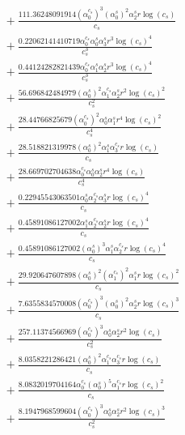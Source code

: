 \documentclass[10pt]{article}
\begin{document}
\begin{align*}
&{}  + \frac{111.36248091914 \left(\alpha_{0}^{c_s}\right)^{3} \left(\alpha_{0}^s\right)^{2} \alpha_{2}^s r \log{\left(c_{s} \right)}}{c_{s}} \\
&{}  + \frac{0.22062141410719 \alpha_{0}^{c_s} \alpha_{0}^s \alpha_{3}^s r^{3} \log{\left(c_{s} \right)}^{4}}{c_{s}^{3}} \\
&{}  + \frac{0.44124282821439 \alpha_{0}^{c_s} \alpha_{1}^s \alpha_{2}^s r^{3} \log{\left(c_{s} \right)}^{4}}{c_{s}^{3}} \\
&{}  + \frac{56.696842484979 \left(\alpha_{0}^s\right)^{2} \alpha_{1}^{c_s} \alpha_{2}^s r^{2} \log{\left(c_{s} \right)}^{2}}{c_{s}^{2}} \\
&{}  + \frac{28.44766825679 \left(\alpha_{0}^{c_s}\right)^{2} \alpha_{0}^s \alpha_{1}^s r^{4} \log{\left(c_{s} \right)}^{2}}{c_{s}^{4}} \\
&{}  + \frac{28.518821319978 \left(\alpha_{0}^s\right)^{2} \alpha_{1}^s \alpha_{3}^{c_s} r \log{\left(c_{s} \right)}}{c_{s}} \\
&{}  + \frac{28.669702704638 \alpha_{0}^{c_s} \alpha_{0}^s \alpha_{2}^s r^{4} \log{\left(c_{s} \right)}}{c_{s}^{4}} \\
&{}  + \frac{0.22945543063501 \alpha_{0}^s \alpha_{2}^{c_s} \alpha_{3}^s r \log{\left(c_{s} \right)}^{4}}{c_{s}} \\
&{}  + \frac{0.45891086127002 \alpha_{1}^s \alpha_{2}^{c_s} \alpha_{2}^s r \log{\left(c_{s} \right)}^{4}}{c_{s}} \\
&{}  + \frac{0.45891086127002 \left(\alpha_{0}^s\right)^{3} \alpha_{1}^s \alpha_{2}^{c_s} r \log{\left(c_{s} \right)}^{4}}{c_{s}} \\
&{}  + \frac{29.920647607898 \left(\alpha_{0}^s\right)^{2} \left(\alpha_{1}^{c_s}\right)^{2} \alpha_{1}^s r \log{\left(c_{s} \right)}^{2}}{c_{s}} \\
&{}  + \frac{7.6355834570008 \left(\alpha_{0}^{c_s}\right)^{3} \left(\alpha_{0}^s\right)^{2} \alpha_{2}^s r \log{\left(c_{s} \right)}^{3}}{c_{s}} \\
&{}  + \frac{257.11374566969 \left(\alpha_{0}^{c_s}\right)^{3} \alpha_{0}^s \alpha_{2}^s r^{2} \log{\left(c_{s} \right)}}{c_{s}^{2}} \\
&{}  + \frac{8.0358221286421 \left(\alpha_{0}^s\right)^{2} \alpha_{1}^{c_s} \alpha_{3}^{c_s} r \log{\left(c_{s} \right)}}{c_{s}} \\
&{}  + \frac{8.0832019704164 \alpha_{0}^{c_s} \left(\alpha_{0}^s\right)^{5} \alpha_{1}^{c_s} r \log{\left(c_{s} \right)}^{2}}{c_{s}} \\
&{}  + \frac{8.1947968599604 \left(\alpha_{0}^{c_s}\right)^{3} \alpha_{0}^s \alpha_{2}^s r^{2} \log{\left(c_{s} \right)}^{3}}{c_{s}^{2}} \\

\end{align*}
\end{document}
